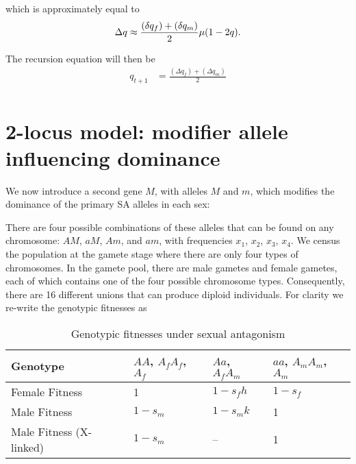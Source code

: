 \documentclass[11pt]{article}
\renewcommand\thesubsection{\arabic{subsection})}
\renewcommand\thesubsubsection{}
\begin{document}
which is approximately equal to 
\begin{equation*}
\Delta q \approx \frac{(\delta q_f) + (\delta q_m )}{2} \mu (1 - 2 q).  \\
\end{equation*}


The recursion equation will then be
\begin{align*}
q_{t + 1} &= \frac{(\Delta q_f) + (\Delta q_m)}{2} \\
\end{align*}

\newpage{}















\renewcommand\thesubsection{\arabic{subsection})}
\renewcommand\thesubsubsection{}
\setcounter{subsection}{0}  %
\setcounter{equation}{0}  %
\section{2-locus model: modifier allele influencing dominance}

We now introduce a second gene $M$, with alleles $M$ and $m$, which modifies the dominance of the primary SA alleles in each sex: \bigskip

There are four possible combinations of these alleles that can be found on any chromosome: $A M$, $a M$, $A m$, and $a m$, with frequencies $x_1$, $x_2$, $x_3$, $x_4$. We census the population at the gamete stage where there are only four types of chromosomes. In the gamete pool, there are male gametes and female gametes, each of which contains one of the four possible chromosome types. Consequently, there are 16 different unions that can produce diploid individuals. For clarity we re-write the genotypic fitnesses as

\renewcommand{\arraystretch}{1.5}
\begin{table}[h]
\caption{Genotypic fitnesses under sexual antagonism}
\label{Table:Fitness}
\centering
\begin{tabular}{l  p{3cm} p{3cm} p{3cm}} \hline
Genotype & $AA$, $A_f A_f$, $A_f$ & $Aa$, $A_f A_m$ & $aa$, $A_m A_m$, $A_m$ \\
\hline
Female Fitness           & 1 & $1 - s_f h$ & $1 - s_f$ \\
Male Fitness              & $1 - s_m$ & $1 - s_m k$ & 1  \\
Male Fitness (X-linked)  & $1 - s_m$ & -- & 1  \\
\hline
\end{tabular}
\bigskip{}
\\
{\footnotesize}
\end{table}
\end{document}
